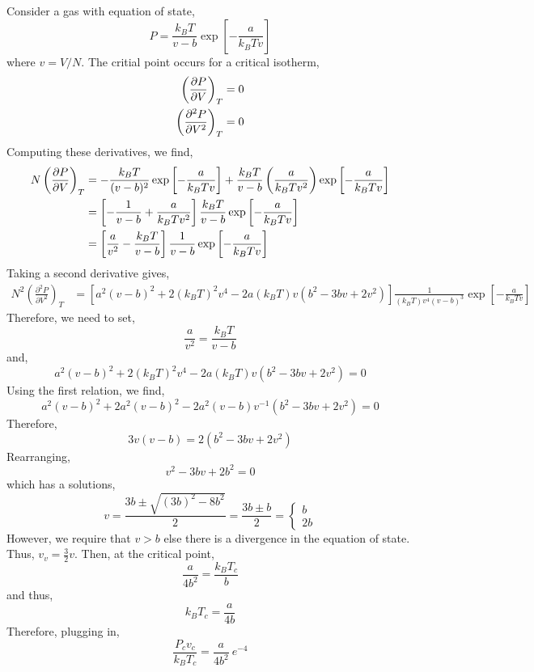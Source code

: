 \documentclass[12pt]{extarticle}
\begin{document}
Consider a gas with equation of state,
\[ P = \frac{k_B T}{v - b} \exp{\left[ - \frac{a}{k_B T v} \right]} \]
where $v = V / N$. The critial point occurs for a critical isotherm,
\begin{align*}
\left( \frac{\partial{P}}{\partial{V}} \right)_{T} & = 0 
\\ 
\left( \frac{\partial^2 P}{\partial V^2} \right)_{T} & = 0
\end{align*}
Computing these derivatives, we find,
\begin{align*}
N \left( \frac{\partial{P}}{\partial{V}} \right)_{T} & = - \frac{k_B T}{(v - b)^2} \exp{\left[ - \frac{a}{k_B T v} \right]} + \frac{k_B T}{v - b} \left( \frac{a}{k_B T v^2} \right) \exp{\left[ - \frac{a}{k_B T v} \right]} 
\\
& = \left[ -\frac{1}{v - b} + \frac{a}{k_B T v^2} \right] \frac{k_B T}{v - b}  \exp{\left[ - \frac{a}{k_B T v} \right]}
\\
& = \left[ \frac{a}{v^2} - \frac{k_B T}{v - b} \right] \frac{1}{v - b}  \exp{\left[ - \frac{a}{k_B T v} \right]} 
\end{align*}
Taking a second derivative gives,
\begin{align*}
N^2 \left( \frac{\partial^2 P}{\partial V^2} \right)_{T} & = \left[ a^2 (v - b)^2 + 2 (k_B T)^2 v^4 - 2 a (k_B T) v (b^2 - 3 b v + 2 v^2) \right] \frac{1}{(k_B T) v^4 (v - b)^3} \exp{\left[ - \frac{a}{k_B T v} \right]} 
\end{align*}
Therefore, we need to set,
\[ \frac{a}{v^2} = \frac{k_B T}{v - b} \]
and,
\[  a^2 (v - b)^2 + 2 (k_B T)^2 v^4 - 2 a (k_B T) v (b^2 - 3 b v + 2 v^2) = 0 \]
Using the first relation, we find,
\[ a^2 (v - b)^2 + 2 a^2 (v - b)^2 - 2 a^2 (v - b) v^{-1} (b^2 - 3 b v + 2 v^2) = 0 \]
Therefore,
\[ 3 v (v - b) = 2 (b^2 - 3 b v + 2 v^2) \]
Rearranging, 
\[ v^2 - 3 b v + 2 b^2 = 0 \]
which has a solutions,
\[ v = \frac{3 b \pm \sqrt{(3 b)^2 - 8 b^2}}{2} = \frac{3 b \pm b}{2} = 
\begin{cases}
b
\\
2 b
\end{cases} \]
However, we require that $v > b$ else there is a divergence in the equation of state. Thus, $v_v = \tfrac{3}{2} v$. 
Then, at the critical point,
\[ \frac{a}{4 b^2} = \frac{k_B T_c}{b} \]
and thus,
\[ k_B T_c = \frac{a}{4 b} \]
Therefore, plugging in,
\[ \frac{P_c v_c}{k_B T_c} = \frac{a}{4 b^2} \: e^{-4} \]
\end{document}
